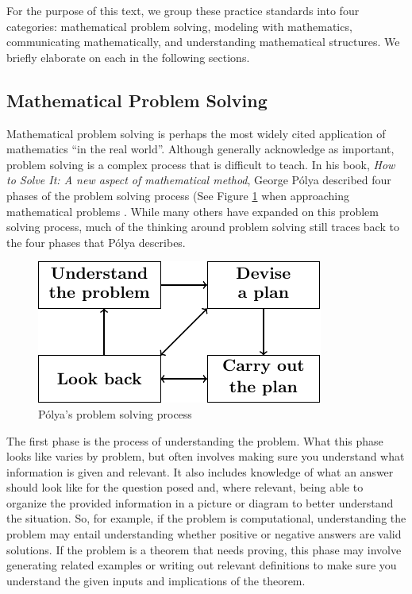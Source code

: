 \documentclass[
]{book}
\theoremstyle{definition}
\theoremstyle{definition}
\theoremstyle{definition}
\theoremstyle{definition}
\theoremstyle{remark}
\begin{document}
For the purpose of this text, we group these practice standards into four categories: mathematical problem solving, modeling with mathematics, communicating mathematically, and understanding mathematical structures. We briefly elaborate on each in the following sections.

\hypertarget{mathematical-problem-solving}{%
\subsection{Mathematical Problem Solving}\label{mathematical-problem-solving}}

Mathematical problem solving is perhaps the most widely cited application of mathematics ``in the real world''. Although generally acknowledge as important, problem solving is a complex process that is difficult to teach. In his book, \emph{How to Solve It: A new aspect of mathematical method}, George Pólya described four phases of the problem solving process (See Figure \ref{fig:polya} when approaching mathematical problems \citep{Polya1945}. While many others have expanded on this problem solving process, much of the thinking around problem solving still traces back to the four phases that Pólya describes.

\begin{figure}

{\centering \includegraphics[width=0.45\linewidth]{tikz/polya} 

}

\caption{Pólya's problem solving process}\label{fig:polya}
\end{figure}

The first phase is the process of understanding the problem. What this phase looks like varies by problem, but often involves making sure you understand what information is given and relevant. It also includes knowledge of what an answer should look like for the question posed and, where relevant, being able to organize the provided information in a picture or diagram to better understand the situation. So, for example, if the problem is computational, understanding the problem may entail understanding whether positive or negative answers are valid solutions. If the problem is a theorem that needs proving, this phase may involve generating related examples or writing out relevant definitions to make sure you understand the given inputs and implications of the theorem.
\end{document}
